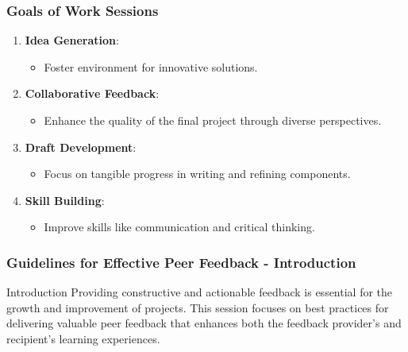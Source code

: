 \documentclass[aspectratio=169]{beamer}
\begin{document}
\begin{frame}[fragile]
    \frametitle{Goals of Work Sessions}
    \begin{enumerate}
        \item \textbf{Idea Generation}:
            \begin{itemize}
                \item Foster environment for innovative solutions.
            \end{itemize}

        \item \textbf{Collaborative Feedback}:
            \begin{itemize}
                \item Enhance the quality of the final project through diverse perspectives.
            \end{itemize}
        
        \item \textbf{Draft Development}:
            \begin{itemize}
                \item Focus on tangible progress in writing and refining components.
            \end{itemize}
        
        \item \textbf{Skill Building}:
            \begin{itemize}
                \item Improve skills like communication and critical thinking.
            \end{itemize}
    \end{enumerate}
\end{frame}

\begin{frame}[fragile]
    \frametitle{Guidelines for Effective Peer Feedback - Introduction}
    \begin{block}{Introduction}
        Providing constructive and actionable feedback is essential for the growth and improvement of projects. This session focuses on best practices for delivering valuable peer feedback that enhances both the feedback provider's and recipient's learning experiences.
    \end{block}
\end{frame}
\end{document}
